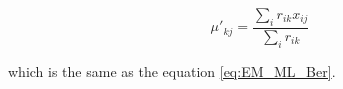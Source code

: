 \documentclass[a4paper,twoside=false,abstract=false,numbers=noenddot,
titlepage=false,headings=small,parskip=half,version=last]{scrartcl}
\begin{document}
\begin{solution}
    \begin{equation}
        \mu'_{kj} = \frac{
            \sum_i r_{ik}x_{ij}
        }
        {
            \sum_i r_{ik}
        }
    \end{equation}

    which is the same as the equation \eqref{eq:EM_ML_Ber}.

\end{solution}

\end{document}
